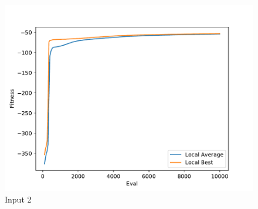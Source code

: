 \documentclass{standalone}
\begin{document}
\begin{figure}[!htb]
	\caption{Input 2}
	\label{fig:graph_2062}
	\includegraphics[width=\textwidth]{../graphs/graphs/2062.pdf}
\end{figure}
\end{document}

